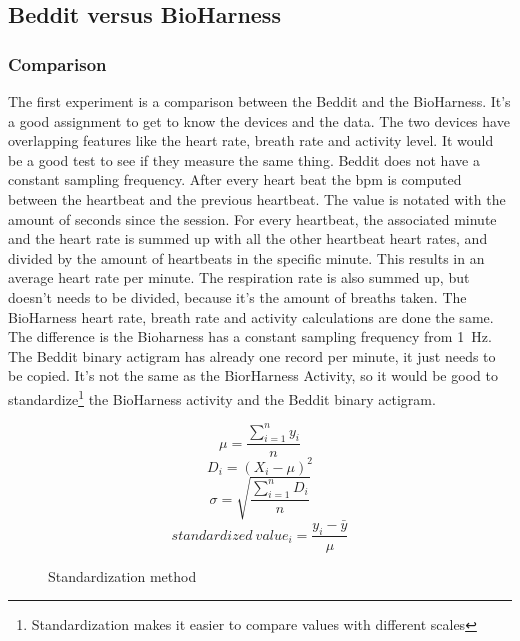 	\subsection{Beddit versus BioHarness}
		\subsubsection{Comparison}
			The first experiment is a comparison between the Beddit and the BioHarness. It's a good assignment to get to know the devices and the data. The two devices have overlapping features like the heart rate, breath rate and activity level. It would be a good test to see if they measure the same thing. 
			Beddit does not have a constant sampling frequency. After every heart beat the bpm is computed between the heartbeat and the previous heartbeat. The value is notated with the amount of seconds since the session. For every heartbeat, the associated minute and the heart rate is summed up with all the other heartbeat heart rates, and divided by the amount of heartbeats in the specific minute. This results in an average heart rate per minute. The respiration rate is also summed up, but doesn't needs to be divided, because it's the amount of breaths taken.
			The BioHarness heart rate, breath rate and activity calculations are done the same. The difference is the Bioharness has a constant sampling frequency from \SI{1}{\hertz}. 
			The Beddit binary actigram has already one record per minute, it just needs to be copied. It's not the same as the BiorHarness Activity, so it would be good to standardize\footnote{Standardization makes it easier to compare values with different scales} the BioHarness activity and the Beddit binary actigram.
			\begin{figure}[h]
				\begin{equation}
					\label{eq:standardize}
					\mu = \frac{ \sum\limits_{i=1}^n y_i } { n }
				\end{equation}
				\begin{equation}
					D_i = (X_i - \mu)^2
				\end{equation}
				\begin{equation}
					\sigma = \sqrt{ \frac{ \sum\limits_{i=1}^n D_i } { n } }
				\end{equation}
				\begin{equation}
					standardized\ value_i = \frac{ y_i - \bar{y} } { \mu }
				\end{equation}
				\caption{Standardization method\cite{statistics}}
			\end{figure}

